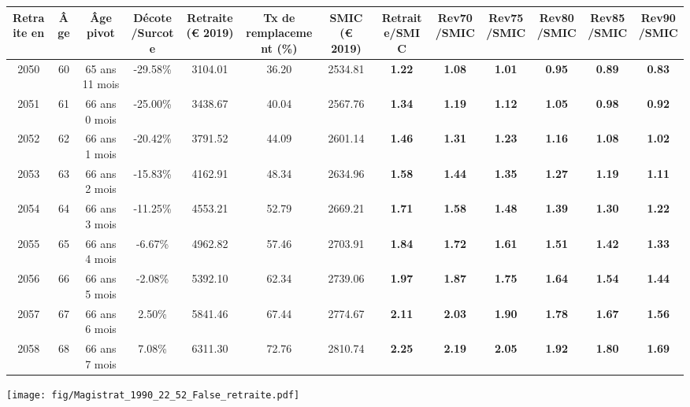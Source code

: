 { \scriptsize \begin{center} 
\begin{tabular}[htb]{|c|c||c|c||c|c||c||c|c|c|c|c|c|} 
\hline 
 Retraite en &  Âge &  Âge pivot &  Décote/Surcote &  Retraite (\euro{} 2019) &  Tx de remplacement (\%) &  SMIC (\euro{} 2019) &  Retraite/SMIC &  Rev70/SMIC &  Rev75/SMIC &  Rev80/SMIC &  Rev85/SMIC &  Rev90/SMIC \\ 
\hline \hline 
 2050 &  60 &  65 ans 11 mois &  -29.58\% &  3104.01 &  36.20 &  2534.81 &  {\bf 1.22} &  {\bf 1.08} &  {\bf 1.01} &  {\bf {\color{red} 0.95}} &  {\bf {\color{red} 0.89}} &  {\bf {\color{red} 0.83}} \\ 
\hline 
 2051 &  61 &  66 ans 0 mois &  -25.00\% &  3438.67 &  40.04 &  2567.76 &  {\bf 1.34} &  {\bf 1.19} &  {\bf 1.12} &  {\bf 1.05} &  {\bf {\color{red} 0.98}} &  {\bf {\color{red} 0.92}} \\ 
\hline 
 2052 &  62 &  66 ans 1 mois &  -20.42\% &  3791.52 &  44.09 &  2601.14 &  {\bf 1.46} &  {\bf 1.31} &  {\bf 1.23} &  {\bf 1.16} &  {\bf 1.08} &  {\bf 1.02} \\ 
\hline 
 2053 &  63 &  66 ans 2 mois &  -15.83\% &  4162.91 &  48.34 &  2634.96 &  {\bf 1.58} &  {\bf 1.44} &  {\bf 1.35} &  {\bf 1.27} &  {\bf 1.19} &  {\bf 1.11} \\ 
\hline 
 2054 &  64 &  66 ans 3 mois &  -11.25\% &  4553.21 &  52.79 &  2669.21 &  {\bf 1.71} &  {\bf 1.58} &  {\bf 1.48} &  {\bf 1.39} &  {\bf 1.30} &  {\bf 1.22} \\ 
\hline 
 2055 &  65 &  66 ans 4 mois &  -6.67\% &  4962.82 &  57.46 &  2703.91 &  {\bf 1.84} &  {\bf 1.72} &  {\bf 1.61} &  {\bf 1.51} &  {\bf 1.42} &  {\bf 1.33} \\ 
\hline 
 2056 &  66 &  66 ans 5 mois &  -2.08\% &  5392.10 &  62.34 &  2739.06 &  {\bf 1.97} &  {\bf 1.87} &  {\bf 1.75} &  {\bf 1.64} &  {\bf 1.54} &  {\bf 1.44} \\ 
\hline 
 2057 &  67 &  66 ans 6 mois &  2.50\% &  5841.46 &  67.44 &  2774.67 &  {\bf 2.11} &  {\bf 2.03} &  {\bf 1.90} &  {\bf 1.78} &  {\bf 1.67} &  {\bf 1.56} \\ 
\hline 
 2058 &  68 &  66 ans 7 mois &  7.08\% &  6311.30 &  72.76 &  2810.74 &  {\bf 2.25} &  {\bf 2.19} &  {\bf 2.05} &  {\bf 1.92} &  {\bf 1.80} &  {\bf 1.69} \\ 
\hline 
\hline 
\end{tabular} 
\end{center} } 

 \begin{center}\texttt{[image: fig/Magistrat\_1990\_22\_52\_False\_retraite.pdf]}\end{center} 

